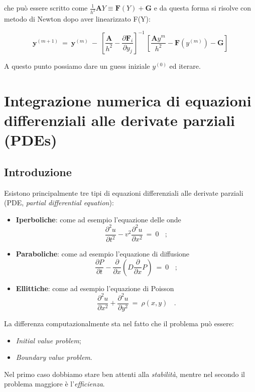 che può essere scritto come $\displaystyle\frac{1}{h^2} \textbf{A}Y \equiv \textbf{F}(Y) + \textbf{G}$ e da questa forma si risolve con metodo di Newton dopo aver linearizzato F(Y):

\[
\textbf{y}^{(m+1)}\ =\ \textbf{y}^{(m)}\ -\ \left[ \frac{\textbf{A}}{h^2} - \frac{\partial \textbf{F}_i}{\partial y_j} \right]^{-1}\, \left[ \frac{\textbf{A}y^{m}}{h^2} - \textbf{F}(y^{(m)}) - \textbf{G} \right]
\]

A questo punto possiamo dare un guess iniziale $y^{(0)} $ ed iterare.



%
%
\chapter{Integrazione numerica di equazioni differenziali alle derivate parziali (PDEs)}

\section{Introduzione}
Esistono principalmente tre tipi di equazioni differenziali alle derivate parziali (PDE, \emph{partial differential equation}):
\begin{itemize}
	\item \textbf{Iperboliche}: come ad esempio l'equazione delle onde 
	\[
		\boxed{\frac{\partial^2 u}{\partial t^2} - v^2 \frac{\partial^2 u}{\partial x^2}\ =\ 0}\ \ \ \ ; 
	\]
	\item \textbf{Paraboliche}: come ad esempio l'equazione di diffusione 
	\[
		\boxed{\frac{\partial P}{\partial t} - \frac{\partial}{\partial x}\left( D\frac{\partial }{\partial x}P\right) \ =\ 0}\ \ \ \ ; 
	\]
	\item \textbf{Ellittiche}: come ad esempio l'equazione di Poisson 
	\[
		\boxed{\frac{\partial^2 u}{\partial x^2} +  \frac{\partial^2 u}{\partial y^2}\ =\ \rho(x, y)}\ \ \ \ .  
	\]
\end{itemize}

La differenza computazionalmente sta nel fatto che il problema può essere:
\begin{itemize}
	\item \emph{Initial value problem};
	\item \emph{Boundary value problem}.
\end{itemize}
Nel primo caso dobbiamo stare ben attenti alla \emph{stabilità}, mentre nel secondo il problema maggiore è l'\emph{efficienza}.


